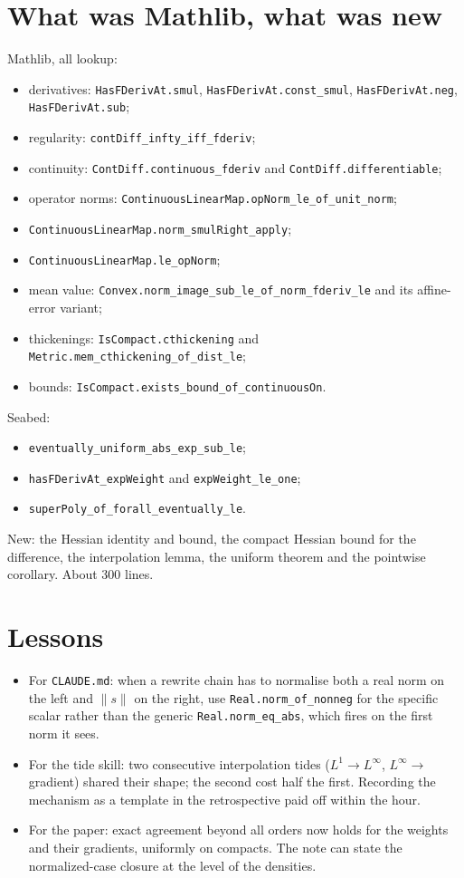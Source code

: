 \documentclass[11pt]{article}
\newcommand{\code}[1]{\texttt{#1}}
\begin{document}
\section{What was Mathlib, what was new}

Mathlib, all lookup:
\begin{itemize}
\item derivatives: \code{HasFDerivAt.smul}, \code{HasFDerivAt.const\_smul},
\code{HasFDerivAt.neg}, \code{HasFDerivAt.sub};
\item regularity: \code{contDiff\_infty\_iff\_fderiv};
\item continuity: \code{ContDiff.continuous\_fderiv} and
\code{ContDiff.differentiable};
\item operator norms: \code{ContinuousLinearMap.opNorm\_le\_of\_unit\_norm};
\item \code{ContinuousLinearMap.norm\_smulRight\_apply};
\item \code{ContinuousLinearMap.le\_opNorm};
\item mean value: \code{Convex.norm\_image\_sub\_le\_of\_norm\_fderiv\_le}
and its affine-error variant;
\item thickenings: \code{IsCompact.cthickening} and
\code{Metric.mem\_cthickening\_of\_dist\_le};
\item bounds: \code{IsCompact.exists\_bound\_of\_continuousOn}.
\end{itemize}

Seabed:
\begin{itemize}
\item \code{eventually\_uniform\_abs\_exp\_sub\_le};
\item \code{hasFDerivAt\_expWeight} and \code{expWeight\_le\_one};
\item \code{superPoly\_of\_forall\_eventually\_le}.
\end{itemize}

New: the Hessian identity and bound, the compact Hessian bound for the
difference, the interpolation lemma, the uniform theorem and the
pointwise corollary. About 300 lines.

\section{Lessons}

\begin{itemize}
\item For \code{CLAUDE.md}: when a rewrite chain has to normalise both a
real norm on the left and $\|s\|$ on the right, use
\code{Real.norm\_of\_nonneg} for the specific scalar rather than the
generic \code{Real.norm\_eq\_abs}, which fires on the first norm it sees.
\item For the tide skill: two consecutive interpolation tides
($L^1 \to L^\infty$, $L^\infty \to$ gradient) shared their shape; the
second cost half the first. Recording the mechanism as a template in the
retrospective paid off within the hour.
\item For the paper: exact agreement beyond all orders now holds for the
weights and their gradients, uniformly on compacts. The note can state
the normalized-case closure at the level of the densities.
\end{itemize}
\end{document}

